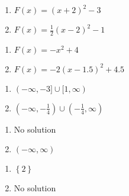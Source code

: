 \begin{multicols}{2}
\begin{enumerate}
\setcounter{enumi}{\value{HW}}

\item $F(x) = (x+2)^2-3$  

\item $F(x) = \frac{1}{2}(x-2)^2-1$

\setcounter{HW}{\value{enumi}}
\end{enumerate}
\end{multicols}

\begin{multicols}{2}
\begin{enumerate}
\setcounter{enumi}{\value{HW}}

\item $F(x) = -x^2+4$  

\item $F(x) =-2(x-1.5)^2+4.5$

\setcounter{HW}{\value{enumi}}
\end{enumerate}
\end{multicols}

\begin{multicols}{2}
\begin{enumerate}
\setcounter{enumi}{\value{HW}}

\item $(-\infty, -3] \cup [1, \infty)$

\item  $\left(-\infty, -\frac{1}{4}\right) \cup \left(-\frac{1}{4}, \infty \right)$

\setcounter{HW}{\value{enumi}}
\end{enumerate}
\end{multicols}

\begin{multicols}{2}
\begin{enumerate}
\setcounter{enumi}{\value{HW}}

\item  No solution
\item  $(-\infty, \infty)$


\setcounter{HW}{\value{enumi}}
\end{enumerate}
\end{multicols}

\begin{multicols}{2}
\begin{enumerate}
\setcounter{enumi}{\value{HW}}

\item  $\left\{2 \right\}$
\item No solution


\setcounter{HW}{\value{enumi}}
\end{enumerate}
\end{multicols}

